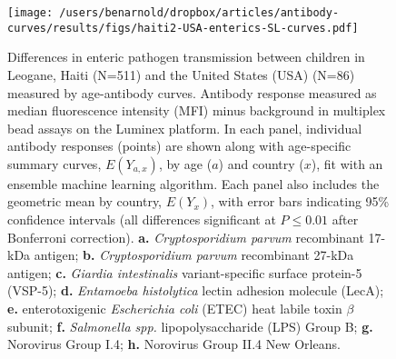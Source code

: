 \documentclass[11pt]{article}
\begin{document}
\begin{landscape}
\begin{figure}[htbp]
\begin{center}
\texttt{[image: /users/benarnold/dropbox/articles/antibody-curves/results/figs/haiti2-USA-enterics-SL-curves.pdf]}
\begin{minipage}{1.3\textwidth}
\caption{Differences in enteric pathogen transmission between children in Leogane, Haiti (N=511) and the United States (USA) (N=86) measured by age-antibody curves. Antibody response measured as median fluorescence intensity (MFI) minus background in multiplex bead assays on the Luminex platform. In each panel, individual antibody responses (points) are shown along with age-specific summary curves, $E(Y_{a,x})$, by age ($a$) and country ($x$), fit with an ensemble machine learning algorithm. Each panel also includes the geometric mean by country, $E(Y_{x})$, with error bars indicating 95\% confidence intervals (all differences significant at $P\leq0.01$ after Bonferroni correction).
\textbf{a.} \textit{Cryptosporidium parvum} recombinant 17-kDa antigen;
\textbf{b.} \textit{Cryptosporidium parvum} recombinant 27-kDa antigen;
\textbf{c.} \textit{Giardia intestinalis} variant-specific surface protein-5 (VSP-5);
\textbf{d.} \textit{Entamoeba histolytica} lectin adhesion molecule (LecA);
\textbf{e.} enterotoxigenic \textit{Escherichia coli} (ETEC) heat labile toxin $\beta$ subunit;
\textbf{f.} \textit{Salmonella spp.} lipopolysaccharide (LPS) Group B;
\textbf{g.} Norovirus Group I.4;
\textbf{h.} Norovirus Group II.4 New Orleans.
}
\label{fig:enterics}
\end{minipage}
\end{center}
\end{figure}
\end{landscape}
\end{document}
